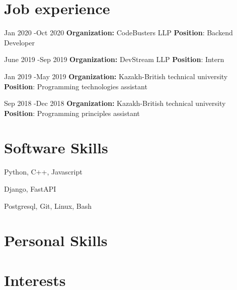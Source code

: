 \documentclass[10pt]{article} %
\begin{document}

\section{Job experience}


\job
{Jan 2020 -}{Oct 2020}
{\textbf{Organization: }CodeBusters LLP}
{\textbf{Position}: Backend Developer}

\job
{June 2019 -}{Sep 2019}
{\textbf{Organization: }DevStream LLP}
{\textbf{Position}: Intern}

\job
{Jan 2019 -}{May 2019}
{\textbf{Organization: }Kazakh-British technical university}
{\textbf{Position}: Programming technologies assistant}


\job
{Sep 2018 -}{Dec 2018}
{\textbf{Organization: }Kazakh-British technical university}
{\textbf{Position}: Programming principles assistant}


\section{Software Skills}

{
Python, C++, Javascript
}


{
Django, FastAPI
}

{
Postgresql, Git, Linux, Bash
}


\section{Personal Skills}

\skillgroup
{
}


\section{Interests}

\end{document}
